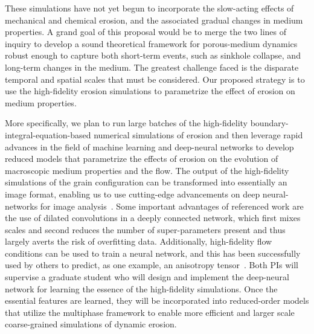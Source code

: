 \documentclass[11pt]{article}
\begin{document}

These simulations have not yet begun to incorporate the slow-acting effects of mechanical and chemical erosion, and the associated gradual changes in medium properties. A grand goal of this proposal would be to merge the two lines of inquiry to develop a sound theoretical framework for porous-medium dynamics robust enough to capture both short-term events, such as sinkhole collapse, and long-term changes in the medium. The greatest challenge faced is the disparate temporal and spatial scales that must be considered. Our proposed strategy is to use the high-fidelity erosion simulations to parametrize the effect of erosion on medium properties.

More specifically, we plan to run large batches of the high-fidelity boundary-integral-equation-based numerical simulations of erosion and then leverage rapid advances in the field of machine learning and deep-neural networks to develop reduced models that parametrize the effects of erosion on the evolution of macroscopic medium properties and the flow.  The output of the high-fidelity simulations of the grain configuration can be transformed into essentially an image format, enabling us to use cutting-edge advancements on deep neural-networks for image analysis~\cite{pelt2018mixed}. Some important advantages of referenced work are the use of dilated convolutions in a deeply connected network, which first mixes scales and second reduces the number of super-parameters present and thus largely averts the risk of overfitting data. Additionally, high-fidelity flow conditions can be used to train a neural network, and this has been successfully used by others to predict, as one example, an anisotropy tensor~\cite{ling2016reynolds}.  Both PIs will supervise a graduate student who will design and implement the deep-neural network for learning the essence of the high-fidelity simulations. Once the essential features are learned, they will be incorporated into reduced-order models that utilize the multiphase framework to enable more efficient and larger scale coarse-grained simulations of dynamic erosion.
\end{document}
